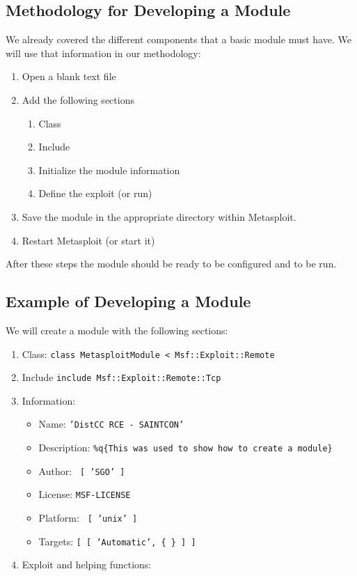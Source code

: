 \subsection{Methodology for Developing a Module}

We already covered the different components that a basic module must have. We will use that information in our methodology: 

\begin{enumerate}
    \item Open a blank text file
    \item Add the following sections
    \begin{enumerate}
        \item Class
        \item Include
        \item Initialize the module information
        \item Define the exploit (or run)
    \end{enumerate}
    \item Save the module in the appropriate directory within Metasploit.
    \item Restart Metasploit (or start it)
\end{enumerate}

After these steps the module should be ready to be configured and to be run.

\subsection{Example of Developing a Module}

We will create a module with the following sections: 

\begin{enumerate}
    \item Class: \texttt{class MetasploitModule < Msf::Exploit::Remote}
    \item Include \texttt{include Msf::Exploit::Remote::Tcp}
    \item Information: 
    \begin{itemize}
        \item Name: \texttt{'DistCC RCE - SAINTCON'}
        \item Description: \texttt{\%q\{This was used to show how to create a module\}}
        \item Author: \texttt{ [ 'SGO' ] }
        \item License: \texttt{MSF-LICENSE}
        \item Platform: \texttt{ [ 'unix' ]}
        \item Targets: \texttt{[ [ 'Automatic', \{ \} ] ]}
    \end{itemize}
    \item Exploit and helping functions:
    \begin{listingbox}
        
    \end{listingbox}
\end{enumerate}

